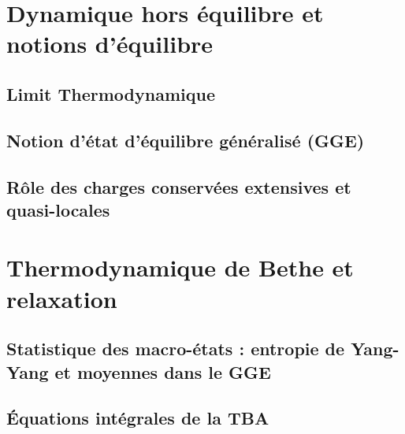 \section{Dynamique hors équilibre et notions d’équilibre}
\subsection{Limit Thermodynamique}

\subsection{Notion d’état d’équilibre généralisé (GGE)}

\subsection{Rôle des charges conservées extensives et quasi-locales}


\section{Thermodynamique de Bethe et relaxation}
\subsection{Statistique des macro-états : entropie de Yang-Yang et moyennes dans le GGE}

\subsection{Équations intégrales de la TBA}



